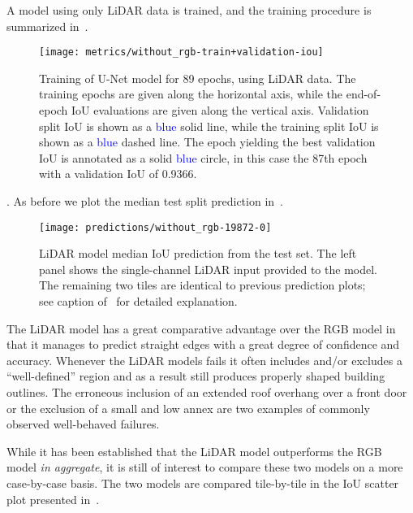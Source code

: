A model using only LiDAR data is trained, and the training procedure is summarized in~.
\begin{figure}[H]
  \centering
  \texttt{[image: metrics/without\_rgb-train+validation-iou]}
  \caption{%
    Training of U-Net model for 89 epochs, using LiDAR data.
    The training epochs are given along the horizontal axis, while the end-of-epoch IoU evaluations are given along the vertical axis.
    Validation split IoU is shown as a \textcolor{blue}{blue} solid line, while the training split IoU is shown as a \textcolor{blue}{blue} dashed line.
    The epoch yielding the best validation IoU is annotated as a solid \textcolor{blue}{blue} circle, in this case the 87th epoch with a validation IoU of \num{0.9366}.
  }%
  \label{fig:lidar-training}
\end{figure}

.
As before we plot the median test split prediction in~.

\begin{figure}[H]
  \centering
  \texttt{[image: predictions/without\_rgb-19872-0]}  %
  \caption{%
    LiDAR model median IoU prediction from the test set.
    The left panel shows the single-channel LiDAR input provided to the model.
    The remaining two tiles are identical to previous prediction plots; see caption of~ for detailed explanation.
  }%
  \label{fig:lidar-median-prediction}
\end{figure}

The LiDAR model has a great comparative advantage over the RGB model in that it manages to predict straight edges with a great degree of confidence and accuracy.
Whenever the LiDAR models fails it often includes and/or excludes a \enquote{well-defined} region and as a result still produces properly shaped building outlines.
The erroneous inclusion of an extended roof overhang over a front door or the exclusion of a small and low annex are two examples of commonly observed well-behaved failures.

While it has been established that the LiDAR model outperforms the RGB model \emph{in aggregate}, it is still of interest to compare these two models on a more case-by-case basis.
The two models are compared tile-by-tile in the IoU scatter plot presented in~.

